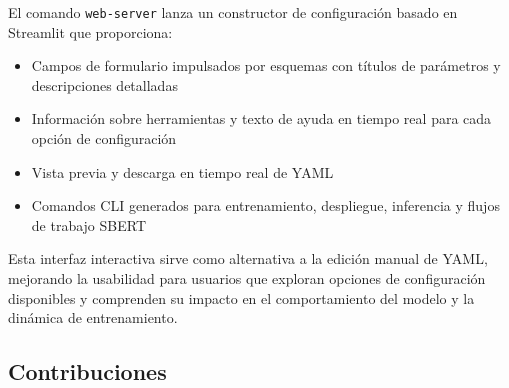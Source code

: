 \documentclass[11pt,a4paper]{article}
\begin{document}
El comando \texttt{web-server} lanza un constructor de configuración basado en Streamlit que proporciona:
\begin{itemize}[leftmargin=*]
    \item Campos de formulario impulsados por esquemas con títulos de parámetros y descripciones detalladas
    \item Información sobre herramientas y texto de ayuda en tiempo real para cada opción de configuración
    \item Vista previa y descarga en tiempo real de YAML
    \item Comandos CLI generados para entrenamiento, despliegue, inferencia y flujos de trabajo SBERT
\end{itemize}

Esta interfaz interactiva sirve como alternativa a la edición manual de YAML, mejorando la usabilidad para usuarios que exploran opciones de configuración disponibles y comprenden su impacto en el comportamiento del modelo y la dinámica de entrenamiento.

\subsection{Contribuciones}
\end{document}
